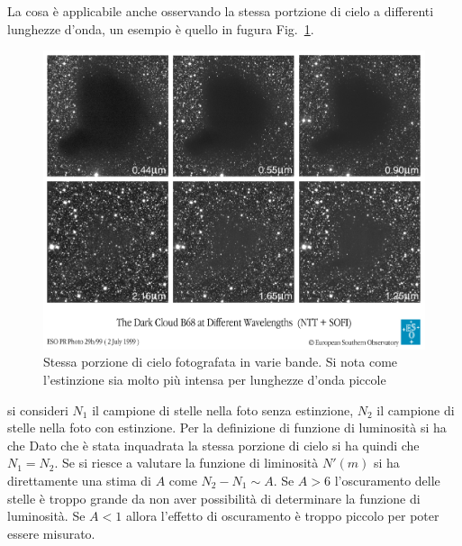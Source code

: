 La cosa \`e applicabile anche osservando la stessa portzione di cielo a differenti lunghezze d'onda, un esempio \`e quello in fugura Fig.~\ref{PHOT:EXTIN}.
\begin{figure}
		\centering
		\includegraphics[scale=1.2]{Estinzione.jpg}
		\caption{Stessa porzione di cielo fotografata in varie bande. Si nota come l'estinzione sia molto pi\`u intensa per lunghezze d'onda piccole}
		\label{PHOT:EXTIN}
\end{figure}
si consideri $N_1$ il campione di stelle nella foto senza estinzione, $N_2$ il campione di stelle nella foto con estinzione. Per la definizione di funzione di luminosit\`a si ha che
Dato che \`e stata inquadrata la stessa porzione di cielo si ha quindi che $N_1 = N_2$. Se si riesce a valutare la funzione di liminosit\`a $N'(m)$ si ha direttamente una stima di $A$ come $N_2 - N_1 \sim A$.
Se $A > 6$ l'oscuramento delle stelle \`e troppo grande da non aver possibilit\`a di determinare la funzione di luminosit\`a. Se $A<1$ allora l'effetto di oscuramento \`e troppo piccolo per poter essere misurato.



























